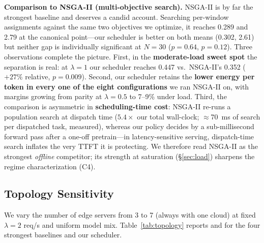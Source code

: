 \textbf{Comparison to NSGA-II (multi-objective search).}
NSGA-II is by far the strongest baseline and deserves a candid
account. Searching per-window assignments against the same two
objectives we optimize, it reaches \slo{} 0.289 and \etok{}
2.79 at the canonical point---our scheduler is better on both
means (0.302, 2.61) but neither gap is individually
significant at $N{=}30$ ($p=0.64$, $p=0.12$). Three
observations complete the picture. First, in the
\textbf{moderate-load sweet spot} the separation is real: at
$\lambda{=}1$ our scheduler reaches \slo{} 0.447 vs.\
NSGA-II's 0.352 ($+27\%$ relative, $p=0.009$). Second, our
scheduler retains the \textbf{lower energy per token in every
one of the eight configurations} we ran NSGA-II on, with
margins growing from parity at $\lambda{=}0.5$ to 7--9\%
under load. Third, the comparison is asymmetric in
\textbf{scheduling-time cost}: NSGA-II re-runs a population
search at dispatch time ($5.4\times$ our total wall-clock;
$\approx$70~ms of search per dispatched task, measured),
whereas our policy decides by a sub-millisecond forward pass
after a one-off pretrain---in latency-sensitive serving,
dispatch-time search inflates the very TTFT it is
protecting. We therefore read NSGA-II as the strongest
\emph{offline} competitor; its strength at saturation
(\S\ref{sec:load}) sharpens the regime characterization
(C4).

\subsection{Topology Sensitivity}
\label{sec:topology}

We vary the number of edge servers from 3 to 7 (always with
one cloud) at fixed $\lambda{=}2$ req/s and uniform model mix.
Table~\ref{tab:topology} reports \slo{} and \etok{} for the
four strongest baselines and our scheduler.

